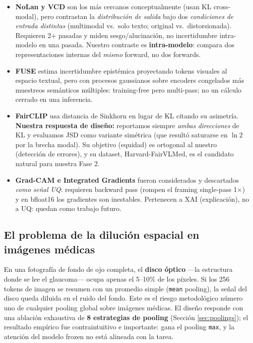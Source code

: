 \documentclass[12pt,a4paper]{article}
\begin{document}
\begin{itemize}[leftmargin=1.4em]
    \item \textbf{NoLan y VCD} son los más cercanos conceptualmente (usan
    KL cross-modal), pero contrastan la \emph{distribución de salida} bajo
    dos \emph{condiciones de entrada distintas} (multimodal vs.\ solo
    texto; original vs.\ distorsionada). Requieren 2+ pasadas y miden
    sesgo/alucinación, no incertidumbre intra-modelo en una pasada.
    Nuestro contraste es \textbf{intra-modelo}: compara dos
    representaciones internas del \emph{mismo} forward, no dos forwards.
    \item \textbf{FUSE} estima incertidumbre epistémica proyectando tokens
    visuales al espacio textual, pero con procesos gaussianos sobre
    encoders congelados más muestreos semánticos múltiples: training-free
    pero multi-pass; no un cálculo cerrado en una inferencia.
    \item \textbf{FairCLIP} usa distancia de Sinkhorn en lugar de KL
    citando su asimetría. \textbf{Nuestra respuesta de diseño:} reportamos
    siempre \emph{ambas direcciones} de KL y evaluamos JSD como variante
    simétrica (que resultó saturarse en $\ln 2$ por la brecha modal). Su
    objetivo (equidad) es ortogonal al nuestro (detección de errores), y
    su dataset, Harvard-FairVLMed, es el candidato natural para nuestra
    Fase 2.
    \item \textbf{Grad-CAM e Integrated Gradients} fueron considerados y
    descartados \emph{como señal UQ}: requieren backward pass (rompen el
    framing single-pass 1$\times$) y en bfloat16 los gradientes son
    inestables. Pertenecen a XAI (explicación), no a UQ: quedan como
    trabajo futuro.
\end{itemize}

\subsection{El problema de la dilución espacial en imágenes médicas}

En una fotografía de fondo de ojo completa, el \textbf{disco óptico} ---la
estructura donde se lee el glaucoma--- ocupa apenas el 5--10\% de los
píxeles. Si los 256 tokens de imagen se resumen con un promedio simple
(\texttt{mean} pooling), la señal del disco queda diluida en el ruido del
fondo. Este es el riesgo metodológico número uno de cualquier pooling
global sobre imágenes médicas. El diseño responde con una ablación
exhaustiva de \textbf{8 estrategias de pooling} (Sección
\ref{sec:poolings}); el resultado empírico fue contraintuitivo e
importante: gana el pooling \texttt{max}, y la atención del modelo frozen
no está alineada con la tarea.
\end{document}
